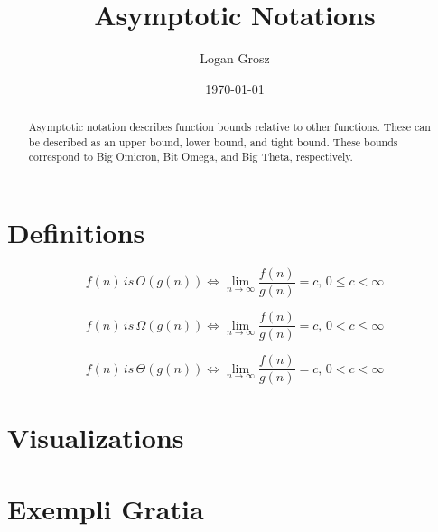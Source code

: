 \documentclass{article}
\title{Asymptotic Notations}
\author{Logan Grosz}
\date{\today}
\begin{document}
	\maketitle
	
	\begin{abstract}
		Asymptotic notation describes function bounds relative to other functions. These can be described as an upper bound, lower bound, and tight bound. These bounds correspond to Big Omicron, Bit Omega, and Big Theta, respectively.
	\end{abstract}

	\section{Definitions}
	
	$$f(n)\,is\,O(g(n)) \iff \lim\limits_{n\to\infty}\dfrac{f(n)}{g(n)}=c,\,0\leq c< \infty$$
	
	$$f(n)\,is\,\Omega(g(n)) \iff \lim\limits_{n\to\infty}\dfrac{f(n)}{g(n)}=c,\,0<c\leq\infty$$
	
	$$f(n)\,is\,\Theta(g(n)) \iff \lim\limits_{n\to\infty}\dfrac{f(n)}{g(n)}=c,\,0<c<\infty$$
	
	\section{Visualizations}
	
	\section{Exempli Gratia}
\end{document}
